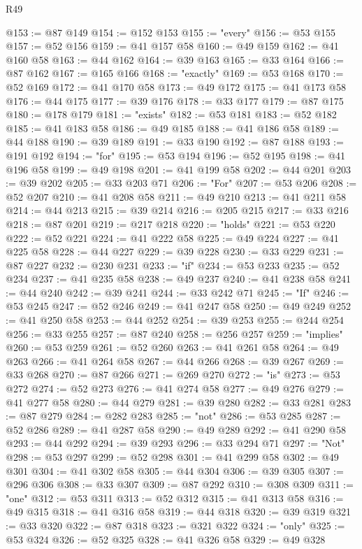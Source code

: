 \begin{lexlean}{R49}
\begin{coremodule}
@153 := @87 @149
@154 := @152 @153
@155 := "every"
@156 := @53 @155
@157 := @52 @156
@159 := @41 @157 @58
@160 := @49 @159
@162 := @41 @160 @58
@163 := @44 @162
@164 := @39 @163
@165 := @33 @164
@166 := @87 @162
@167 := @165 @166
@168 := "exactly"
@169 := @53 @168
@170 := @52 @169
@172 := @41 @170 @58
@173 := @49 @172
@175 := @41 @173 @58
@176 := @44 @175
@177 := @39 @176
@178 := @33 @177
@179 := @87 @175
@180 := @178 @179
@181 := "exists"
@182 := @53 @181
@183 := @52 @182
@185 := @41 @183 @58
@186 := @49 @185
@188 := @41 @186 @58
@189 := @44 @188
@190 := @39 @189
@191 := @33 @190
@192 := @87 @188
@193 := @191 @192
@194 := "for"
@195 := @53 @194
@196 := @52 @195
@198 := @41 @196 @58
@199 := @49 @198
@201 := @41 @199 @58
@202 := @44 @201
@203 := @39 @202
@205 := @33 @203 @71
@206 := "For"
@207 := @53 @206
@208 := @52 @207
@210 := @41 @208 @58
@211 := @49 @210
@213 := @41 @211 @58
@214 := @44 @213
@215 := @39 @214
@216 := @205 @215
@217 := @33 @216
@218 := @87 @201
@219 := @217 @218
@220 := "holds"
@221 := @53 @220
@222 := @52 @221
@224 := @41 @222 @58
@225 := @49 @224
@227 := @41 @225 @58
@228 := @44 @227
@229 := @39 @228
@230 := @33 @229
@231 := @87 @227
@232 := @230 @231
@233 := "if"
@234 := @53 @233
@235 := @52 @234
@237 := @41 @235 @58
@238 := @49 @237
@240 := @41 @238 @58
@241 := @44 @240
@242 := @39 @241
@244 := @33 @242 @71
@245 := "If"
@246 := @53 @245
@247 := @52 @246
@249 := @41 @247 @58
@250 := @49 @249
@252 := @41 @250 @58
@253 := @44 @252
@254 := @39 @253
@255 := @244 @254
@256 := @33 @255
@257 := @87 @240
@258 := @256 @257
@259 := "implies"
@260 := @53 @259
@261 := @52 @260
@263 := @41 @261 @58
@264 := @49 @263
@266 := @41 @264 @58
@267 := @44 @266
@268 := @39 @267
@269 := @33 @268
@270 := @87 @266
@271 := @269 @270
@272 := "is"
@273 := @53 @272
@274 := @52 @273
@276 := @41 @274 @58
@277 := @49 @276
@279 := @41 @277 @58
@280 := @44 @279
@281 := @39 @280
@282 := @33 @281
@283 := @87 @279
@284 := @282 @283
@285 := "not"
@286 := @53 @285
@287 := @52 @286
@289 := @41 @287 @58
@290 := @49 @289
@292 := @41 @290 @58
@293 := @44 @292
@294 := @39 @293
@296 := @33 @294 @71
@297 := "Not"
@298 := @53 @297
@299 := @52 @298
@301 := @41 @299 @58
@302 := @49 @301
@304 := @41 @302 @58
@305 := @44 @304
@306 := @39 @305
@307 := @296 @306
@308 := @33 @307
@309 := @87 @292
@310 := @308 @309
@311 := "one"
@312 := @53 @311
@313 := @52 @312
@315 := @41 @313 @58
@316 := @49 @315
@318 := @41 @316 @58
@319 := @44 @318
@320 := @39 @319
@321 := @33 @320
@322 := @87 @318
@323 := @321 @322
@324 := "only"
@325 := @53 @324
@326 := @52 @325
@328 := @41 @326 @58
@329 := @49 @328

\end{coremodule}
\end{lexlean}
